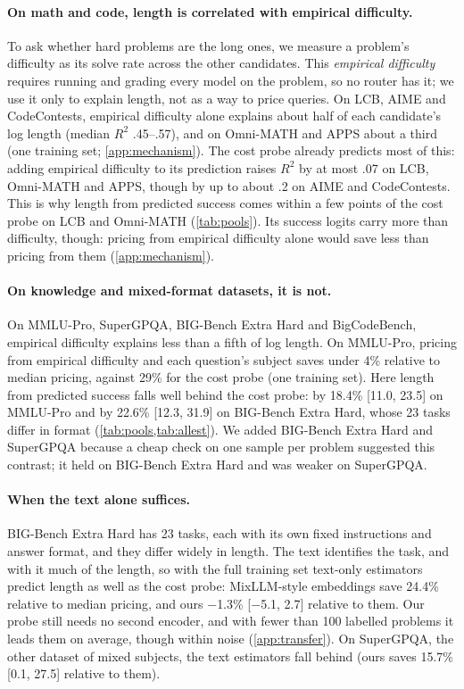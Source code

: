 \documentclass[10pt]{article}
\begin{document}
\paragraph{On math and code, length is correlated with empirical difficulty.}
To ask whether hard problems are the long ones, we measure a problem's difficulty as its solve rate across the other candidates. This \emph{empirical difficulty} requires running and grading every model on the problem, so no router has it; we use it only to explain length, not as a way to price queries. On LCB, AIME and CodeContests, empirical difficulty alone explains about half of each candidate's log length (median $R^2$ .45--.57), and on Omni-MATH and APPS about a third (one training set; \cref{app:mechanism}). The cost probe already predicts most of this: adding empirical difficulty to its prediction raises $R^2$ by at most .07 on LCB, Omni-MATH and APPS, though by up to about .2 on AIME and CodeContests. This is why length from predicted success comes within a few points of the cost probe on LCB and Omni-MATH (\cref{tab:pools}). Its success logits carry more than difficulty, though: pricing from empirical difficulty alone would save less than pricing from them (\cref{app:mechanism}).

\paragraph{On knowledge and mixed-format datasets, it is not.}
On MMLU-Pro, SuperGPQA, BIG-Bench Extra Hard and BigCodeBench, empirical difficulty explains less than a fifth of log length. On MMLU-Pro, pricing from empirical difficulty and each question's subject saves under 4\% relative to median pricing, against 29\% for the cost probe (one training set). Here length from predicted success falls well behind the cost probe: by 18.4\% [11.0, 23.5] on MMLU-Pro and by 22.6\% [12.3, 31.9] on BIG-Bench Extra Hard, whose 23 tasks differ in format (\cref{tab:pools,tab:allest}). We added BIG-Bench Extra Hard and SuperGPQA because a cheap check on one sample per problem suggested this contrast; it held on BIG-Bench Extra Hard and was weaker on SuperGPQA.

\paragraph{When the text alone suffices.}
BIG-Bench Extra Hard has 23 tasks, each with its own fixed instructions and answer format, and they differ widely in length. The text identifies the task, and with it much of the length, so with the full training set text-only estimators predict length as well as the cost probe: MixLLM-style embeddings save 24.4\% relative to median pricing, and ours $-$1.3\% [$-$5.1, 2.7] relative to them. Our probe still needs no second encoder, and with fewer than 100 labelled problems it leads them on average, though within noise (\cref{app:transfer}). On SuperGPQA, the other dataset of mixed subjects, the text estimators fall behind (ours saves 15.7\% [0.1, 27.5] relative to them).
\end{document}
